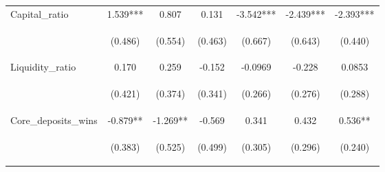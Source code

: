 \begin{tabular}{lcccccc}
Capital\_ratio & 1.539*** & 0.807 & 0.131 & -3.542*** & -2.439*** & -2.393*** \\
\vspace{4pt} & \begin{footnotesize}(0.486)\end{footnotesize} & \begin{footnotesize}(0.554)\end{footnotesize} & \begin{footnotesize}(0.463)\end{footnotesize} & \begin{footnotesize}(0.667)\end{footnotesize} & \begin{footnotesize}(0.643)\end{footnotesize} & \begin{footnotesize}(0.440)\end{footnotesize} \\
Liquidity\_ratio & 0.170 & 0.259 & -0.152 & -0.0969 & -0.228 & 0.0853 \\
\vspace{4pt} & \begin{footnotesize}(0.421)\end{footnotesize} & \begin{footnotesize}(0.374)\end{footnotesize} & \begin{footnotesize}(0.341)\end{footnotesize} & \begin{footnotesize}(0.266)\end{footnotesize} & \begin{footnotesize}(0.276)\end{footnotesize} & \begin{footnotesize}(0.288)\end{footnotesize} \\
Core\_deposits\_wins & -0.879** & -1.269** & -0.569 & 0.341 & 0.432 & 0.536** \\
\vspace{4pt} & \begin{footnotesize}(0.383)\end{footnotesize} & \begin{footnotesize}(0.525)\end{footnotesize} & \begin{footnotesize}(0.499)\end{footnotesize} & \begin{footnotesize}(0.305)\end{footnotesize} & \begin{footnotesize}(0.296)\end{footnotesize} & \begin{footnotesize}(0.240)\end{footnotesize} \\

\end{tabular}

